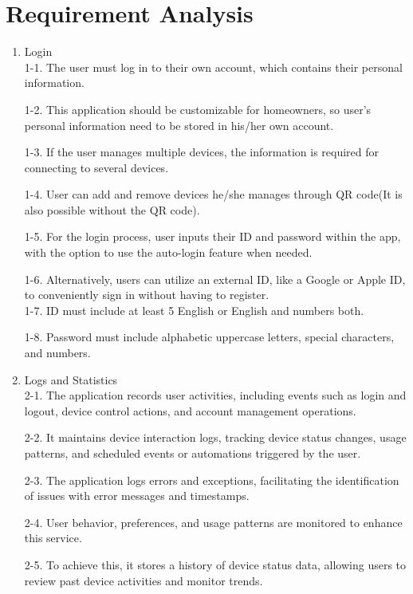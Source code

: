 \documentclass[11pt, conference]{IEEEtran}
\begin{document}
\section{\Large{Requirement Analysis}}
\begin{enumerate}[label=\arabic*]
    \item {\large{Login}}\\
    1-1. The user must log in to their own account, which contains their personal information. 
    
    1-2. This application should be customizable for homeowners, so user’s personal information need to be stored in his/her own account. 
    
    1-3. If the user manages multiple devices, the information is required for connecting to several devices.
    
    1-4. User can add and remove devices he/she manages through QR code(It is also possible without the QR code).
    
    1-5. For the login process, user inputs their ID and password within the app, with the option to use the auto-login feature when needed. 
    
    1-6. Alternatively, users can utilize an external ID, like a Google or Apple ID, to conveniently sign in without having to register.\\

    1-7. ID must include at least 5 English or English and numbers both.

    1-8. Password must include alphabetic uppercase letters, special characters, and numbers.

    \item {\large{Logs and Statistics}}\\
    2-1. The application records user activities, including events such as login and logout, device control actions, and account management operations. 
    
    2-2. It maintains device interaction logs, tracking device status changes, usage patterns, and scheduled events or automations triggered by the user. 
    
    2-3. The application logs errors and exceptions, facilitating the identification of issues with error messages and timestamps. 
    
    2-4. User behavior, preferences, and usage patterns are monitored to enhance this service. 
    
    2-5. To achieve this, it stores a history of device status data, allowing users to review past device activities and monitor trends.\\


\end{enumerate}
\end{document}
